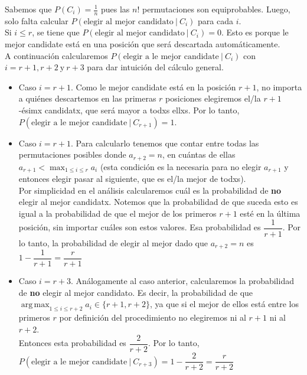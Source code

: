 \documentclass[a4paper]{article}
\DeclareMathOperator*{\argmax}{arg\,max}
\begin{document}
Sabemos que $P(C_i) = \frac{1}{n}$ pues las $n!$ permutaciones son equiprobables. Luego, solo falta calcular $P(\text{elegir al mejor candidato} \ | \ C_i)$ para cada $i$.\\

Si $i \leq r$, se tiene que $P(\text{elegir al mejor candidato} \ | \ C_i) = 0$. Esto es porque le mejor candidate está en una posición que será descartada automáticamente. \\

A continuación calcularemos $P(\text{elegir a le mejor candidate} \ | \ C_i)$ con $i = r+1, r+2 \ \text{y} \ r+3$ para dar intuición del cálculo general.
\begin{itemize}
    \item Caso $i = r+1$. Como le mejor candidate está en la posición $r+1$, no importa a quiénes descartemos en las primeras $r$ posiciones elegiremos el/la $r+1$-ésimx candidatx, que será mayor a todxs ellxs. Por lo tanto, $P(\text{elegir a le mejor candidate} \ | \ C_{r+1}) = 1$.
    \item Caso $i = r+1$. Para calcularlo tenemos que contar entre todas las permutaciones posibles donde $a_{r+2} = n$, en cuántas de ellas $a_{r+1} < \displaystyle\max_{1 \leq i \leq r} a_i$ (esta condición es la necesaria para no elegir $a_{r+1}$ y entonces elegir pasar al siguiente, que es el/la mejor de todxs). \\

Por simplicidad en el análisis calcularemos cuál es la probabilidad de \textbf{no} elegir al mejor candidatx. Notemos que la probabilidad de que suceda esto es igual a la probabilidad de que el mejor de los primeros $r+1$ esté en la última posición, sin importar cuáles son estos valores. Esa probabilidad es $\dfrac{1}{r+1}$. Por lo tanto, la probabilidad de elegir al mejor dado que $a_{r+2} = n$ es $1 - \dfrac{1}{r+1} = \dfrac{r}{r+1}$
    \item Caso $i = r+3$. Análogamente al caso anterior, calcularemos la probabilidad de \textbf{no} elegir al mejor candidato. Es decir, la probabilidad de que $\displaystyle\argmax_{1 \leq i \leq r+2} a_i \in \{r+1, r+2\}$, ya que si el mejor de ellos está entre los primeros $r$ por definición del procedimiento no elegiremos ni al $r+1$ ni al $r+2$.\\
    Entonces esta probabilidad es $\dfrac{2}{r+2}$. Por lo tanto, $P(\text{elegir a le mejor candidate} \ | \ C_{r+3}) = 1 - \dfrac{2}{r+2} = \dfrac{r}{r+2}$

\end{itemize}
\end{document}
